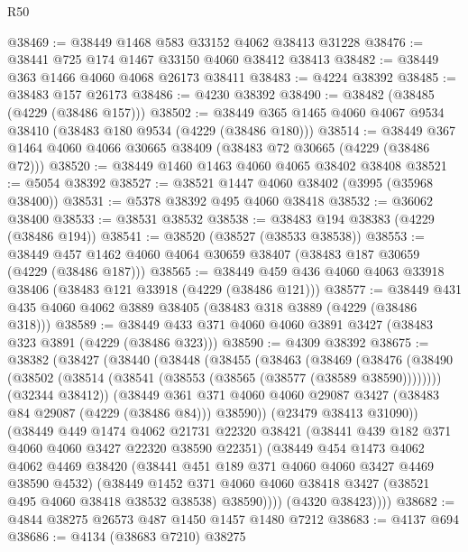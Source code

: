 \begin{lexlean}{R50}
\begin{coremodule}
@38469 := @38449 @1468 @583 @33152 @4062 @38413 @31228
@38476 := @38441 @725 @174 @1467 @33150 @4060 @38412 @38413
@38482 := @38449 @363 @1466 @4060 @4068 @26173 @38411
@38483 := @4224 @38392
@38485 := @38483 @157 @26173
@38486 := @4230 @38392
@38490 := @38482 (@38485 (@4229 (@38486 @157)))
@38502 := @38449 @365 @1465 @4060 @4067 @9534 @38410 (@38483 @180 @9534 (@4229 (@38486 @180)))
@38514 := @38449 @367 @1464 @4060 @4066 @30665 @38409 (@38483 @72 @30665 (@4229 (@38486 @72)))
@38520 := @38449 @1460 @1463 @4060 @4065 @38402 @38408
@38521 := @5054 @38392
@38527 := @38521 @1447 @4060 @38402 (@3995 (@35968 @38400))
@38531 := @5378 @38392 @495 @4060 @38418
@38532 := @36062 @38400
@38533 := @38531 @38532
@38538 := @38483 @194 @38383 (@4229 (@38486 @194))
@38541 := @38520 (@38527 (@38533 @38538))
@38553 := @38449 @457 @1462 @4060 @4064 @30659 @38407 (@38483 @187 @30659 (@4229 (@38486 @187)))
@38565 := @38449 @459 @436 @4060 @4063 @33918 @38406 (@38483 @121 @33918 (@4229 (@38486 @121)))
@38577 := @38449 @431 @435 @4060 @4062 @3889 @38405 (@38483 @318 @3889 (@4229 (@38486 @318)))
@38589 := @38449 @433 @371 @4060 @4060 @3891 @3427 (@38483 @323 @3891 (@4229 (@38486 @323)))
@38590 := @4309 @38392
@38675 := @38382
    (@38427
      (@38440
        (@38448
          (@38455
            (@38463
              (@38469
                (@38476
                  (@38490 (@38502 (@38514 (@38541 (@38553 (@38565 (@38577 (@38589 @38590))))))))
                  (@32344 @38412))
                (@38449
                  @361
                  @371
                  @4060
                  @4060
                  @29087
                  @3427
                  (@38483 @84 @29087 (@4229 (@38486 @84)))
                  @38590))
              (@23479 @38413 @31090))
            (@38449
              @449
              @1474
              @4062
              @21731
              @22320
              @38421
              (@38441 @439 @182 @371 @4060 @4060 @3427 @22320 @38590 @22351)
              (@38449
                @454
                @1473
                @4062
                @4062
                @4469
                @38420
                (@38441 @451 @189 @371 @4060 @4060 @3427 @4469 @38590 @4532)
                (@38449
                  @1452
                  @371
                  @4060
                  @4060
                  @38418
                  @3427
                  (@38521 @495 @4060 @38418 @38532 @38538)
                  @38590))))
          (@4320 @38423))))
@38682 := @4844 @38275 @26573 @487 @1450 @1457 @1480 @7212
@38683 := @4137 @694
@38686 := @4134 (@38683 @7210) @38275

\end{coremodule}
\end{lexlean}
